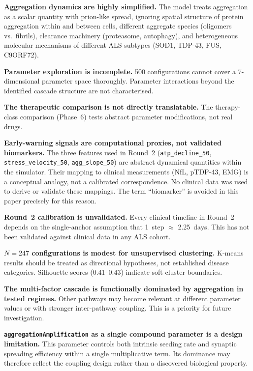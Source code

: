 \documentclass[12pt,a4paper]{article}
\begin{document}
\textbf{Aggregation dynamics are highly simplified.}
The model treats aggregation as a scalar quantity with prion-like spread, ignoring spatial
structure of protein aggregation within and between cells, different aggregate species (oligomers
vs.\ fibrils), clearance machinery (proteasome, autophagy), and heterogeneous molecular
mechanisms of different ALS subtypes (SOD1, TDP-43, FUS, C9ORF72).

\textbf{Parameter exploration is incomplete.}
500 configurations cannot cover a 7-dimensional parameter space thoroughly. Parameter
interactions beyond the identified cascade structure are not characterised.

\textbf{The therapeutic comparison is not directly translatable.}
The therapy-class comparison (Phase~6) tests abstract parameter modifications, not real drugs.

\textbf{Early-warning signals are computational proxies, not validated biomarkers.}
The three features used in Round~2 (\texttt{atp\_decline\_50}, \texttt{stress\_velocity\_50},
\texttt{agg\_slope\_50}) are abstract dynamical quantities within the simulator. Their mapping
to clinical measurements (NfL, pTDP-43, EMG) is a conceptual analogy, not a calibrated
correspondence. No clinical data was used to derive or validate these mappings. The term
``biomarker'' is avoided in this paper precisely for this reason.

\textbf{Round~2 calibration is unvalidated.}
Every clinical timeline in Round~2 depends on the single-anchor assumption that 1~step
$\approx$ 2.25~days. This has not been validated against clinical data in any ALS cohort.

\textbf{$N = 247$ configurations is modest for unsupervised clustering.}
K-means results should be treated as directional hypotheses, not established disease categories.
Silhouette scores (0.41--0.43) indicate soft cluster boundaries.

\textbf{The multi-factor cascade is functionally dominated by aggregation in tested regimes.}
Other pathways may become relevant at different parameter values or with stronger inter-pathway
coupling. This is a priority for future investigation.

\textbf{\texttt{aggregationAmplification} as a single compound parameter is a design limitation.}
This parameter controls both intrinsic seeding rate and synaptic spreading efficiency within a
single multiplicative term. Its dominance may therefore reflect the coupling design rather than
a discovered biological property.
\end{document}
